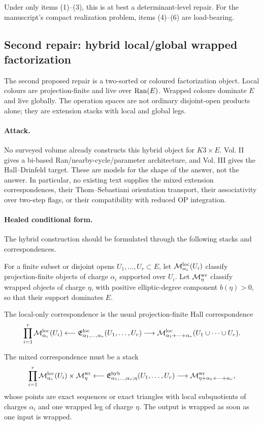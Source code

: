 Under only items (1)--(3), this is at best a determinant-level repair.
For the manuscript's compact realization problem, items (4)--(6) are
load-bearing.

\subsection{Second repair: hybrid local/global wrapped factorization}

The second proposed repair is a two-sorted or coloured factorization
object.  Local colours are projection-finite and live over
\(\operatorname{Ran}(E)\).  Wrapped colours dominate \(E\) and live globally.  The
operation spaces are not ordinary disjoint-open products alone; they are
extension stacks with local and global legs.

\paragraph{Attack.}
No surveyed volume already constructs this hybrid object for
\(K3\times E\).  Vol. II gives a bi-based Ran/nearby-cycle/parameter
architecture, and Vol. III gives the Hall--Drinfeld target.  These are
models for the shape of the answer, not the answer.  In particular, no
existing text supplies the mixed extension correspondences, their
Thom--Sebastiani orientation transport, their associativity over
two-step flags, or their compatibility with reduced OP integration.

\paragraph{Healed conditional form.}
The hybrid construction should be formulated through the following
stacks and correspondences.

For a finite subset or disjoint opens \(U_1,\ldots,U_r\subset E\), let
\(\mathcal M^{\mathrm{loc}}_{\alpha_i}(U_i)\) classify projection-finite objects of charge
\(\alpha_i\) supported over \(U_i\).  Let \(\mathcal M^{\mathrm{wr}}_{\eta}\) classify
wrapped objects of charge \(\eta\), with positive elliptic-degree
component \(b(\eta)>0\), so that their support dominates \(E\).

The local-only correspondence is the usual projection-finite Hall
correspondence
\[
\prod_{i=1}^r \mathcal M^{\mathrm{loc}}_{\alpha_i}(U_i)
\longleftarrow
\mathfrak E^{\mathrm{loc}}_{\alpha_1,\ldots,\alpha_r}(U_1,\ldots,U_r)
\longrightarrow
\mathcal M^{\mathrm{loc}}_{\alpha_1+\cdots+\alpha_r}(U_1\cup\cdots\cup U_r).
\]

The mixed correspondence must be a stack
\[
\prod_{i=1}^r \mathcal M^{\mathrm{loc}}_{\alpha_i}(U_i)\times \mathcal M^{\mathrm{wr}}_{\eta}
\longleftarrow
\mathfrak E^{\mathrm{hyb}}_{\alpha_1,\ldots,\alpha_r;\eta}(U_1,\ldots,U_r)
\longrightarrow
\mathcal M^{\mathrm{wr}}_{\eta+\alpha_1+\cdots+\alpha_r},
\]
whose points are exact sequences or exact triangles with local
subquotients of charges \(\alpha_i\) and one wrapped leg of charge
\(\eta\).  The output is wrapped as soon as one input is wrapped.


